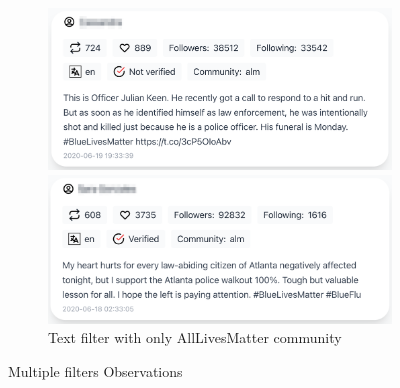 \begin{figure}[H]
\begin{subfigure}{.45\textwidth}
  \centering
  \captionsetup{justification=centering}
  \includegraphics[width=0.9\linewidth]{./pics/obserpa1}
  
  \includegraphics[width=0.9\linewidth]{./pics/obserpa2}
  \caption{Text filter with only AllLivesMatter community}
  \label{fig:sub-third-tfoalmc}
\end{subfigure}

\captionsetup{justification=centering}
\caption{Multiple filters Observations}
\label{fig:e-m-f-obs}
\end{figure}


